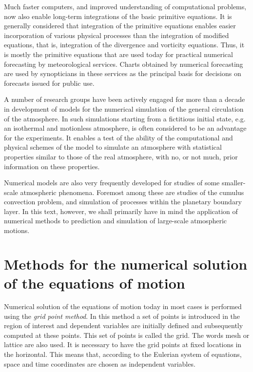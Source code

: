 Much faster computers, and improved understanding of computational problems, now also enable long-term integrations of the basic primitive equations. It is generally considered that integration of the primitive equations enables easier incorporation of various physical processes than the integration of modified equations, that is, integration of the divergence and vorticity equations. Thus, it is mostly the primitive equations that are used today for practical numerical forecasting by meteorological services. Charts obtained by numerical forecasting are used by synopticians in these services as the principal basis for decisions on forecasts issued for public use.

A number of research groups have been actively engaged for more than a decade in development of models for the numerical simulation of the general circulation of the atmosphere. In such simulations starting from a fictitious initial state, e.g. an isothermal and motionless atmosphere, is often considered to be an advantage for the experiments. It enables a test of the ability of the computational and physical schemes of the model to simulate an atmosphere with statistical properties similar to those of the real atmosphere, with no, or not much, prior information on these properties.

Numerical models are also very frequently developed for studies of some smaller-scale atmospheric phenomena. Foremost among these are studies of the cumulus convection problem, and simulation of processes within the planetary boundary layer. In this text, however, we shall primarily have in mind the application of numerical methods to prediction and simulation of large-scale atmospheric motions.



\section{Methods for the numerical solution of the equations of motion}
Numerical solution of the equations of motion today in most cases is performed using the \textit{grid point method}. In this method a set of points is introduced in the region of interest and dependent variables are initially defined and subsequently computed at these points. This set of points is called the grid. The words mesh or lattice are also used. It is necessary to have the grid points at fixed locations in the horizontal. This means that, according to the Eulerian system of equations, space and time coordinates are chosen as independent variables.

